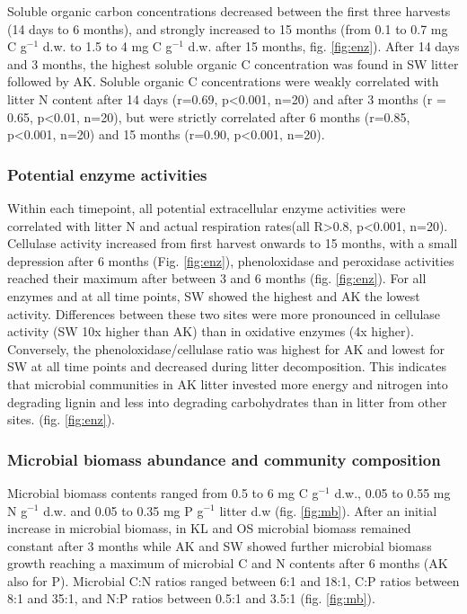 Soluble organic carbon concentrations decreased between the first three harvests (14 days to 6 months), and strongly increased to 15 months (from 0.1 to 0.7 mg C g$^{-1}$  d.w. to 1.5 to 4 mg C g$^{-1}$ d.w. after 15 months, fig. \ref{fig:enz}). After 14 days and 3 months, the highest soluble organic C concentration was found in SW litter followed by AK. Soluble organic C concentrations were weakly correlated with litter N content after 14 days (r=0.69, p\textless 0.001, n=20) and after 3 months (r = 0.65, p\textless 0.01, n=20), but were strictly correlated after 6 months (r=0.85, p\textless 0.001, n=20) and 15 months (r=0.90, p\textless 0.001, n=20).



\subsubsection*{Potential enzyme activities}
Within each timepoint, all potential extracellular enzyme activities were correlated with litter N and actual respiration rates(all R\textgreater 0.8, p\textless 0.001, n=20). Cellulase activity increased from first harvest onwards to 15 months, with a small depression after 6 months (Fig. \ref{fig:enz}), phenoloxidase and peroxidase activities reached their maximum after between 3 and 6 months (fig. \ref{fig:enz}). For all enzymes and at all time points, SW showed the highest and AK the lowest activity. Differences between these two sites were more pronounced in cellulase activity (SW 10x higher than AK) than in oxidative enzymes (4x higher). Conversely, the phenoloxidase/cellulase ratio was highest for AK and lowest for SW at all time points and decreased during litter decomposition. This indicates that microbial communities in AK litter invested more energy and nitrogen into degrading lignin and less into degrading carbohydrates than in litter from other sites. (fig. \ref{fig:enz}).

\subsubsection*{Microbial biomass abundance and community composition}
Microbial biomass contents ranged from 0.5 to 6 mg C g$^{-1}$ d.w., 0.05 to 0.55 mg N g$^{-1}$ d.w. and 0.05 to 0.35 mg P g$^{-1}$ litter d.w (fig. \ref{fig:mb}). After an initial increase in microbial biomass, in KL and OS microbial biomass remained constant after 3 months while AK and SW showed further microbial biomass growth reaching a maximum of microbial C and N contents after 6 months (AK also for P). Microbial C:N ratios ranged between 6:1 and 18:1, C:P ratios between 8:1 and 35:1, and N:P ratios between 0.5:1 and 3.5:1 (fig. \ref{fig:mb}).

